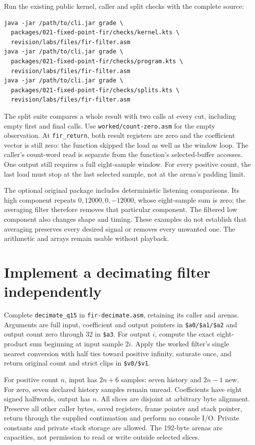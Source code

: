 Run the existing public kernel, caller and split checks with the complete source:
\begin{verbatim}
java -jar /path/to/cli.jar grade \
  packages/021-fixed-point-fir/checks/kernel.kts \
  revision/labs/files/fir-filter.asm
java -jar /path/to/cli.jar grade \
  packages/021-fixed-point-fir/checks/program.kts \
  revision/labs/files/fir-filter.asm
java -jar /path/to/cli.jar grade \
  packages/021-fixed-point-fir/checks/splits.kts \
  revision/labs/files/fir-filter.asm
\end{verbatim}
The split suite compares a whole result with two calls at every cut, including
empty first and final calls. Use \texttt{worked/count-zero.asm} for the empty
observation. At \texttt{fir\_return}, both result registers are zero and the
coefficient vector is still zero: the function skipped the load as well as the
window loop. The caller's count-word read is separate from the function's
selected-buffer accesses. One output still requires a full eight-sample window. For every positive
count, the last load must stop at the last selected sample, not at the arena's
padding limit.

The optional original package includes deterministic listening comparisons.
Its high component repeats $0,12000,0,-12000$, whose eight-sample sum is zero;
the averaging filter therefore removes that particular component. The filtered
low component also changes shape and timing. These examples do not establish
that averaging preserves every desired signal or removes every unwanted one.
The arithmetic and arrays remain usable without playback.

\section{Implement a decimating filter independently}

Complete \texttt{decimate\_q15} in \texttt{fir-decimate.asm}, retaining its caller
and arenas. Arguments are full input, coefficient and output pointers in
\texttt{\$a0/\$a1/\$a2} and output count zero through 32 in \texttt{\$a3}.
For output $i$, compute the exact eight-product sum beginning at input sample
$2i$. Apply the worked filter's single nearest conversion with half ties toward
positive infinity, saturate once, and return original count and strict clips in
\texttt{\$v0/\$v1}.

For positive count $n$, input has $2n+6$ samples: seven history and $2n-1$ new.
For zero, seven declared history samples remain unread. Coefficients have eight
signed halfwords, output has $n$. All slices are disjoint at arbitrary byte
alignment. Preserve all other caller bytes, saved registers, frame pointer and
stack pointer, return through the supplied continuation and perform no console
I/O. Private constants and private stack storage are allowed. The 192-byte
arenas are capacities, not permission to read or write outside selected slices.

